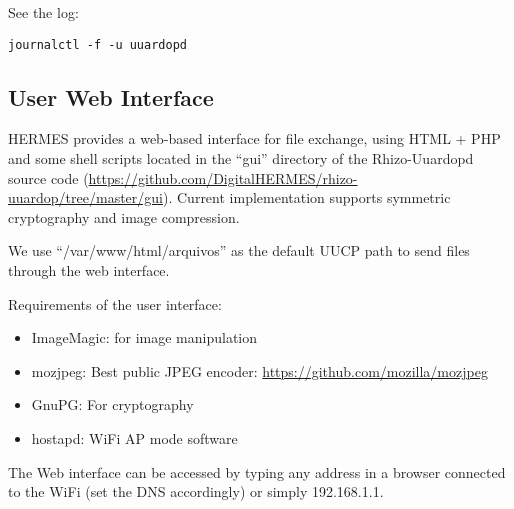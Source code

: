 \documentclass[11pt,a4paper]{article}
\begin{document}
See the log:
\begin{verbatim}
journalctl -f -u uuardopd
\end{verbatim}





\subsection{User Web Interface}

HERMES provides a web-based interface for file exchange, using HTML + PHP and
some shell scripts located in the ``gui'' directory of the Rhizo-Uuardopd source
code
(\url{https://github.com/DigitalHERMES/rhizo-uuardop/tree/master/gui}). Current
implementation supports symmetric cryptography and image compression.

We use ``/var/www/html/arquivos'' as the default UUCP path to send
files through the web interface.

Requirements of the user interface:

\begin{itemize}
\item ImageMagic: for image manipulation
\item mozjpeg: Best public JPEG encoder: \url{https://github.com/mozilla/mozjpeg}
\item GnuPG: For cryptography
\item hostapd: WiFi AP mode software
\end{itemize}

The Web interface can be accessed by typing any address in a browser
connected to the WiFi (set the DNS accordingly) or simply 192.168.1.1.

\end{document}
